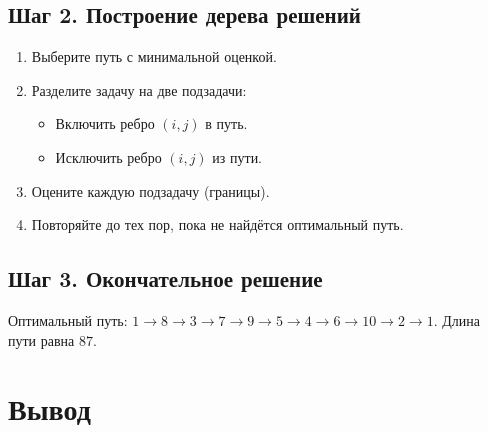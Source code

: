 \documentclass{article}
\begin{document}
\subsection*{Шаг 2. Построение дерева решений}

\begin{enumerate}
    \item Выберите путь с минимальной оценкой.
    \item Разделите задачу на две подзадачи:
          \begin{itemize}
              \item Включить ребро $(i, j)$ в путь.
              \item Исключить ребро $(i, j)$ из пути.
          \end{itemize}
    \item Оцените каждую подзадачу (границы).
    \item Повторяйте до тех пор, пока не найдётся оптимальный путь.
\end{enumerate}

\subsection*{Шаг 3. Окончательное решение}

Оптимальный путь: $1 \to 8 \to 3 \to 7 \to 9 \to 5 \to 4 \to 6 \to 10 \to 2 \to 1$. Длина пути равна $87$.

\section*{Вывод}
\end{document}
